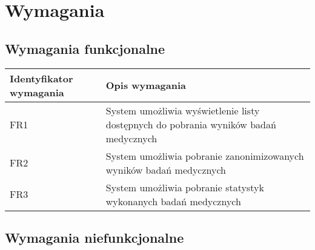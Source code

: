 \chapter{Wymagania}



\section{Wymagania funkcjonalne}

  \begin{longtable}{| p{} || p{} |} 
\hline
\textbf{Identyfikator wymagania} & \textbf{Opis wymagania} \\ \hline
FR1 & System umożliwia wyświetlenie listy dostępnych do pobrania wyników badań medycznych \\ \hline
FR2 & System umożliwia pobranie zanonimizowanych wyników badań medycznych
 \\ \hline
FR3 & System umożliwia pobranie statystyk wykonanych badań medycznych
 \\ \hline
  \end{longtable} 

\section{Wymagania niefunkcjonalne}

